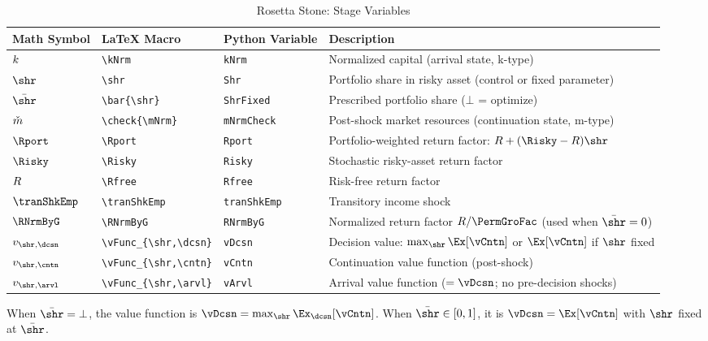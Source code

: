 \begin{table}[h]
\caption{Rosetta Stone:  Stage Variables}
\label{tab:rosetta-portable}
\begin{center}
\begin{tabular}{l|l|l|l}
Math Symbol & \LaTeX{} Macro & Python Variable & Description \\
\hline
$k$             & \verb|\kNrm|             & \texttt{kNrm}        & Normalized capital (arrival state, k-type) \\
$\shr$              & \verb|\shr|              & \texttt{Shr}         & Portfolio share in risky asset (control or fixed parameter) \\
$\bar{\shr}$        & \verb|\bar{\shr}|        & \texttt{ShrFixed}    & Prescribed portfolio share ($\bot$ = optimize) \\
$\check{m}$     & \verb|\check{\mNrm}|     & \texttt{mNrmCheck}   & Post-shock market resources (continuation state, m-type) \\
$\Rport$            & \verb|\Rport|            & \texttt{Rport}       & Portfolio-weighted return factor: $\Rfree + (\Risky - \Rfree)\shr$ \\
$\Risky$            & \verb|\Risky|            & \texttt{Risky}       & Stochastic risky-asset return factor \\
$R$            & \verb|\Rfree|            & \texttt{Rfree}       & Risk-free return factor \\
$\tranShkEmp$       & \verb|\tranShkEmp|       & \texttt{tranShkEmp}  & Transitory income shock \\
$\RNrmByG$          & \verb|\RNrmByG|          & \texttt{RNrmByG}     & Normalized return factor $\Rfree / \PermGroFac$ (used when $\bar{\shr}=0$) \\
$\vFunc_{\shr,\dcsn}$ & \verb|\vFunc_{\shr,\dcsn}| & \texttt{vDcsn}  & Decision value: $\max_{\shr} \Ex[\vCntn]$ or $\Ex[\vCntn]$ if $\shr$ fixed \\
$\vFunc_{\shr,\cntn}$ & \verb|\vFunc_{\shr,\cntn}| & \texttt{vCntn}  & Continuation value function (post-shock) \\
$\vFunc_{\shr,\arvl}$ & \verb|\vFunc_{\shr,\arvl}| & \texttt{vArvl}  & Arrival value function ($= \vDcsn$; no pre-decision shocks) \\
\hline
\end{tabular}
\end{center}
\end{table}

\noindent When $\bar{\shr} = \bot$, the {\Decision} value function is $\vDcsn = \max_{\shr} \Ex_{\dcsn}[\vCntn]$.  When $\bar{\shr} \in [0,1]$, it is $\vDcsn = \Ex[\vCntn]$ with $\shr$ fixed at $\bar{\shr}$.

